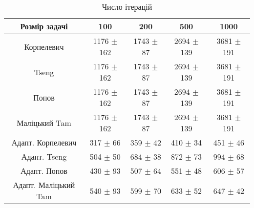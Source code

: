 \begin{table}[H]
	\centering
	\begin{tabular}{|c||c|c|c|c|}\hline
		Розмір задачі & 100 & 200 & 500 & 1000 \\ \hline \hline 
		Корпелевич & 1176 $\pm$ 162 & 1743 $\pm$ 87 & 2694 $\pm$ 139 & 3681 $\pm$ 191 \\ \hline
		Tseng & 1176 $\pm$ 162 & 1743 $\pm$ 87 & 2694 $\pm$ 139 & 3681 $\pm$ 191 \\ \hline
		Попов & 1176 $\pm$ 162 & 1743 $\pm$ 87 & 2694 $\pm$ 139 & 3681 $\pm$ 191 \\ \hline
		Маліцький Tam & 1176 $\pm$ 162 & 1743 $\pm$ 87 & 2694 $\pm$ 139 & 3681 $\pm$ 191 \\ \hline \hline
		Адапт. Корпелевич & 317 $\pm$ 66 & 359 $\pm$ 42 & 410 $\pm$ 34 & 451 $\pm$ 46 \\ \hline
		Адапт. Tseng & 504 $\pm$ 50 & 684 $\pm$ 38 & 872 $\pm$ 73 & 994 $\pm$ 68 \\ \hline
		Адапт. Попов & 430 $\pm$ 93 & 507 $\pm$ 64 & 551 $\pm$ 48 & 606 $\pm$ 57 \\ \hline
		Адапт. Маліцький Tam & 540 $\pm$ 93 & 599 $\pm$ 70 & 633 $\pm$ 52 & 647 $\pm$ 42 \\ \hline
	\end{tabular}
	\caption{Число ітерацій}
\end{table}
